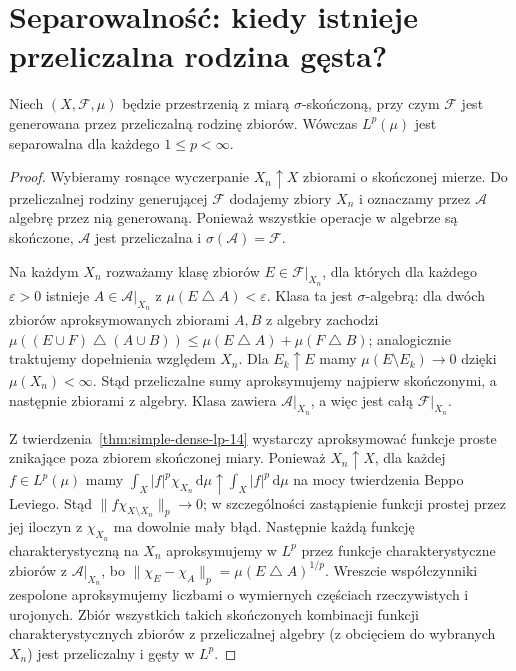 \section{Separowalność: kiedy istnieje przeliczalna rodzina gęsta?}

\begin{twierdzenie}[Separowalność $L^p$]
\label{thm:separable-lp-14}
Niech $(X,\mathcal F,\mu)$ będzie przestrzenią
z miarą $\sigma$-skończoną, przy czym $\mathcal F$
jest generowana przez przeliczalną rodzinę zbiorów.
Wówczas $L^p(\mu)$ jest separowalna dla
każdego $1\le p<\infty$.
\end{twierdzenie}
\begin{proof}
Wybieramy rosnące wyczerpanie $X_n\uparrow X$
zbiorami o skończonej mierze. Do przeliczalnej
rodziny generującej $\mathcal F$ dodajemy zbiory $X_n$
i oznaczamy przez $\mathcal A$ algebrę przez nią generowaną.
Ponieważ wszystkie operacje w algebrze są skończone,
$\mathcal A$ jest przeliczalna i $\sigma(\mathcal A)=\mathcal F$.

Na każdym $X_n$ rozważamy klasę zbiorów $E\in\mathcal F|_{X_n}$,
dla których dla każdego $\varepsilon>0$ istnieje
$A\in\mathcal A|_{X_n}$ z
$\mu(E\mathbin\triangle A)<\varepsilon$.
Klasa ta jest $\sigma$-algebrą: dla dwóch zbiorów
aproksymowanych zbiorami $A,B$ z algebry zachodzi
$\mu((E\cup F)\mathbin\triangle(A\cup B))\le
\mu(E\mathbin\triangle A)+\mu(F\mathbin\triangle B)$;
analogicznie traktujemy dopełnienia względem $X_n$.
Dla $E_k\uparrow E$ mamy
$\mu(E\setminus E_k)\to0$ dzięki
$\mu(X_n)<\infty$. Stąd przeliczalne sumy
aproksymujemy najpierw skończonymi, a następnie
zbiorami z algebry. Klasa zawiera $\mathcal A|_{X_n}$,
a więc jest całą $\mathcal F|_{X_n}$.

Z twierdzenia~\ref{thm:simple-dense-lp-14}
wystarczy aproksymować funkcje proste znikające
poza zbiorem skończonej miary. Ponieważ $X_n\uparrow X$, dla każdej
$f\in L^p(\mu)$ mamy
$\int_X |f|^p\chi_{X_n}\,\mathrm d\mu
\uparrow\int_X|f|^p\,\mathrm d\mu$
na mocy twierdzenia Beppo Leviego.
Stąd $\|f\chi_{X\setminus X_n}\|_p\to0$;
w szczególności zastąpienie funkcji prostej
przez jej iloczyn z $\chi_{X_n}$ ma dowolnie mały błąd. Następnie każdą
funkcję charakterystyczną na $X_n$ aproksymujemy
w $L^p$ przez funkcje charakterystyczne zbiorów z
$\mathcal A|_{X_n}$, bo
$\|\chi_E-\chi_A\|_p
=\mu(E\mathbin\triangle A)^{1/p}$.
Wreszcie współczynniki zespolone aproksymujemy
liczbami o wymiernych częściach rzeczywistych
i urojonych. Zbiór wszystkich takich skończonych
kombinacji funkcji charakterystycznych zbiorów z przeliczalnej
algebry (z obcięciem do wybranych $X_n$) jest
przeliczalny i gęsty w $L^p$.
\end{proof}

